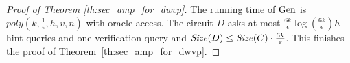 \begin{proof}[Proof of Theorem \ref{th:sec_amp_for_dwvp}]
The running time of $\operatorname{\text{Gen}}$ is  $poly(k,\frac{1}{\epsilon},h,v,n)$ with oracle access.
The circuit $D$ asks at most $\frac{6k}{\epsilon} \log(\frac{6k}{\epsilon})h$ hint queries and one verification query and
$\operatorname{\mathit{Size}}(D) \leq \operatorname{\mathit{Size}}(C) \cdot \frac{6k}{\varepsilon}$.
This finishes the proof of Theorem~\ref{th:sec_amp_for_dwvp}.
\end{proof}

